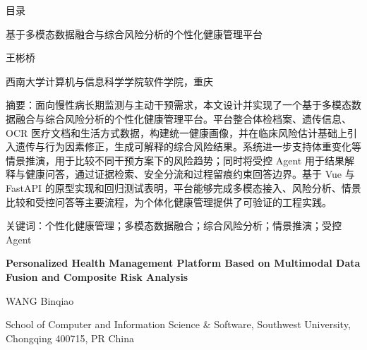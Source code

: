 \documentclass[UTF8, a4paper, 12pt, oneside]{ctexrep}
\makeatletter
\numberwithin{equation}{chapter}
\newcommand{\thesistableofcontents}{%
    \clearpage
    \phantomsection
    {\centering\heiti\zihao{3}目\quad 录\par}
    \vspace{\baselineskip}
    {\songti\zihao{-4}\onehalfspacing\@starttoc{toc}}%
}
\makeatother
\begin{document}


\clearpage
{}
\setcounter{page}{1}

\thesistableofcontents
\clearpage

\setcounter{page}{1}

{}
\thispagestyle{plain}
{
\centering
{\abstracttitlefont{} 基于多模态数据融合与综合风险分析的个性化健康管理平台\par}
\vspace{\baselineskip}
{\songti{} 王彬桥\par}
{\songti{} 西南大学计算机与信息科学学院\enspace 软件学院，重庆\par}
\vspace{\baselineskip}
}

{\fangsong{}
\noindent 摘\quad 要：面向慢性病长期监测与主动干预需求，本文设计并实现了一个基于多模态数据融合与综合风险分析的个性化健康管理平台。平台整合体检档案、遗传信息、OCR 医疗文档和生活方式数据，构建统一健康画像，并在临床风险估计基础上引入遗传与行为因素修正，生成可解释的综合风险结果。系统进一步支持体重变化等情景推演，用于比较不同干预方案下的风险趋势；同时将受控 Agent 用于结果解释与健康问答，通过证据检索、安全分流和过程留痕约束回答边界。基于 Vue 与 FastAPI 的原型实现和回归测试表明，平台能够完成多模态接入、风险分析、情景比较和受控问答等主要流程，为个体化健康管理提供了可验证的工程实践。
\par}

{\songti{}
\noindent 关键词：个性化健康管理；多模态数据融合；综合风险分析；情景推演；受控 Agent\par}

\newpage
{}
{}
\thispagestyle{plain}
{
\centering
\vspace{\baselineskip}
{\rmfamily\bfseries{} Personalized Health Management Platform Based on Multimodal Data Fusion and Composite Risk Analysis\par}
\vspace{\baselineskip}
{\rmfamily{} WANG Binqiao\par}
{\rmfamily{} School of Computer and Information Science \& Software, Southwest University, Chongqing 400715, PR China\par}
\vspace{\baselineskip}
}
\end{document}
